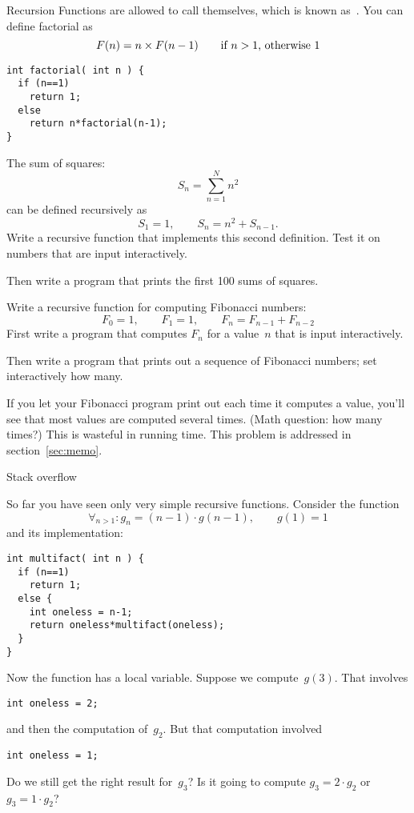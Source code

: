 \begin{slide}{Recursion}
  \label{sl:func-recur}
  Functions are allowed to call themselves, which is known
  as~. You can define factorial as
  \[ F(n) = n \times F(n-1) \qquad \hbox{if $n>1$, otherwise~$1$} \]
\begin{verbatim}
int factorial( int n ) {
  if (n==1)
    return 1;
  else
    return n*factorial(n-1);
}
\end{verbatim}
\end{slide}

\begin{exercise}
  \label{ex:recur-sum}
  The sum of squares:
  \[ S_n = \sum_{n=1}^N n^2 \]
  can be defined recursively as
  \[ S_1=1,\qquad S_n = n^2 + S_{n-1}. \]
  Write a recursive function that implements this second definition.
  Test it on numbers that are input interactively.

  Then write a program that prints the first 100 sums of squares.
\end{exercise}

\begin{exercise}
  \label{ex:recur-fib}
  Write a recursive function for computing Fibonacci numbers:
  \[ F_0=1,\qquad F_1=1,\qquad F_{n}=F_{n-1}+F_{n-2} \]
  First write a program that computes $F_n$ for a value~$n$ that is
  input interactively.

  Then write a program that prints out a sequence of Fibonacci
  numbers; set interactively how many.
\end{exercise}

If you let your Fibonacci program print out each time it computes a
value, you'll see that most values are computed several times. (Math
question: how many times?) This is wasteful in running time. This
problem is addressed in section~\ref{sec:memo}.

 {Stack overflow}

So far you have seen only very simple recursive functions. Consider
the function
\[ \forall_{n>1}\colon g_n = (n-1)\cdot g(n-1),\qquad g(1)=1 \]
and its implementation:
\begin{verbatim}
int multifact( int n ) {
  if (n==1)
    return 1;
  else {
    int oneless = n-1;
    return oneless*multifact(oneless);
  }
}
\end{verbatim}
Now the function has a local variable. Suppose we compute~$g(3)$. That
involves
\begin{verbatim}
int oneless = 2;
\end{verbatim}
and then the computation of~$g_2$. But that computation involved 
\begin{verbatim}
int oneless = 1;
\end{verbatim}
Do we still get the right result for~$g_3$? Is it going to compute
$g_3=2\cdot g_2$ or $g_3=1\cdot g_2$?

